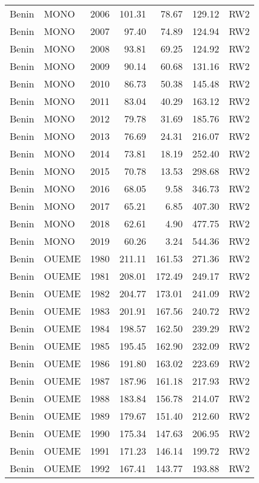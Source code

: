\begin{longtable}{lllrrrl}
  Benin & MONO & 2006 & 101.31 & 78.67 & 129.12 & RW2 \\ 
  Benin & MONO & 2007 & 97.40 & 74.89 & 124.94 & RW2 \\ 
  Benin & MONO & 2008 & 93.81 & 69.25 & 124.92 & RW2 \\ 
  Benin & MONO & 2009 & 90.14 & 60.68 & 131.16 & RW2 \\ 
  Benin & MONO & 2010 & 86.73 & 50.38 & 145.48 & RW2 \\ 
  Benin & MONO & 2011 & 83.04 & 40.29 & 163.12 & RW2 \\ 
  Benin & MONO & 2012 & 79.78 & 31.69 & 185.76 & RW2 \\ 
  Benin & MONO & 2013 & 76.69 & 24.31 & 216.07 & RW2 \\ 
  Benin & MONO & 2014 & 73.81 & 18.19 & 252.40 & RW2 \\ 
  Benin & MONO & 2015 & 70.78 & 13.53 & 298.68 & RW2 \\ 
  Benin & MONO & 2016 & 68.05 & 9.58 & 346.73 & RW2 \\ 
  Benin & MONO & 2017 & 65.21 & 6.85 & 407.30 & RW2 \\ 
  Benin & MONO & 2018 & 62.61 & 4.90 & 477.75 & RW2 \\ 
  Benin & MONO & 2019 & 60.26 & 3.24 & 544.36 & RW2 \\ 
  Benin & OUEME & 1980 & 211.11 & 161.53 & 271.36 & RW2 \\ 
  Benin & OUEME & 1981 & 208.01 & 172.49 & 249.17 & RW2 \\ 
  Benin & OUEME & 1982 & 204.77 & 173.01 & 241.09 & RW2 \\ 
  Benin & OUEME & 1983 & 201.91 & 167.56 & 240.72 & RW2 \\ 
  Benin & OUEME & 1984 & 198.57 & 162.50 & 239.29 & RW2 \\ 
  Benin & OUEME & 1985 & 195.45 & 162.90 & 232.09 & RW2 \\ 
  Benin & OUEME & 1986 & 191.80 & 163.02 & 223.69 & RW2 \\ 
  Benin & OUEME & 1987 & 187.96 & 161.18 & 217.93 & RW2 \\ 
  Benin & OUEME & 1988 & 183.84 & 156.78 & 214.07 & RW2 \\ 
  Benin & OUEME & 1989 & 179.67 & 151.40 & 212.60 & RW2 \\ 
  Benin & OUEME & 1990 & 175.34 & 147.63 & 206.95 & RW2 \\ 
  Benin & OUEME & 1991 & 171.23 & 146.14 & 199.72 & RW2 \\ 
  Benin & OUEME & 1992 & 167.41 & 143.77 & 193.88 & RW2 \\ 

\end{longtable}
